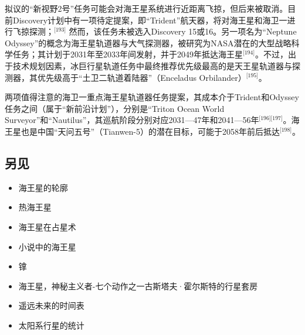 拟议的“新视野2号”任务可能会对海王星系统进行近距离飞掠，但后来被取消。目前Discovery计划中有一项待定提案，即“Trident”航天器，将对海王星和海卫一进行飞掠探测；\(^\text{[193]}\) 然而，该任务未被选入Discovery 15或16。另一项名为“Neptune Odyssey”的概念为海王星轨道器与大气探测器，被研究为NASA潜在的大型战略科学任务；其计划于2031年至2033年间发射，并于2049年抵达海王星\(^\text{[194]}\)。不过，出于技术规划因素，冰巨行星轨道任务中最终推荐优先级最高的是天王星轨道器与探测器，其优先级高于“土卫二轨道着陆器”（Enceladus Orbilander）\(^\text{[195]}\)。

两项值得注意的海卫一重点海王星轨道器任务提案，其成本介于Trident和Odyssey任务之间（属于“新前沿计划”），分别是“Triton Ocean World Surveyor”和“Nautilus”，其巡航阶段分别对应2031—47年和2041—56年\(^\text{[196][197]}\)。海王星也是中国“天问五号”（Tianwen-5）的潜在目标，可能于2058年前后抵达\(^\text{[198]}\)。
\subsection{另见}
\begin{itemize}
\item 海王星的轮廓
\item 热海王星
\item 海王星在占星术
\item 小说中的海王星
\item 镎
\item 海王星，神秘主义者-七个动作之一古斯塔夫·霍尔斯特的行星套房
\item 遥远未来的时间表
\item 太阳系行星的统计
\end{itemize}
